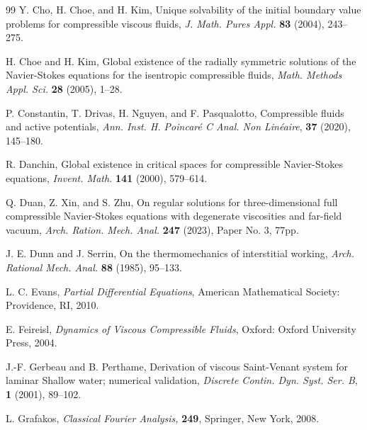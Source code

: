 \documentclass[11pt,reqno]{amsart}
\numberwithin{rk}{section}
\numberwithin{prop}{section}
\numberwithin{mydef}{section}
\numberwithin{lem}{section}
\numberwithin{equation}{section}
\numberwithin{thm}{section}
\begin{document}
\begin{thebibliography}{99}
 Y. Cho, H. Choe, and H. Kim, Unique solvability of the initial boundary value problems for compressible viscous  fluids, \textit{J. Math. Pures Appl.} \textbf{83} (2004), 243--275.


 


 H. Choe and  H. Kim, Global existence of the radially symmetric solutions of the Navier-Stokes equations for the isentropic compressible fluids, \textit{Math. Methods Appl. Sci.} \textbf{28} (2005), 1--28.


 


 P. Constantin, T. Drivas, H. Nguyen, and  F. Pasqualotto, Compressible fluids and active potentials, \textit{Ann. Inst. H. Poincar\'e C  Anal. Non Lin\'eaire}, \textbf{37} (2020), 145--180.


 R. Danchin, Global existence in critical spaces for compressible Navier-Stokes equations, \textit{Invent. Math. } \textbf{141} (2000), 579--614.



 


 Q. Duan, Z. Xin, and S. Zhu, On regular solutions for three-dimensional full compressible Navier-Stokes equations with degenerate viscosities and far-field vacuum, \textit{Arch. Ration. Mech. Anal.} \textbf{247} (2023), Paper No. 3, 77pp.


 J. E. Dunn and  J. Serrin, On the thermomechanics of interstitial working, \textit{Arch. Rational Mech. Anal.} \textbf{88}  (1985), 95--133.

              




 L. C. Evans, {\em Partial Differential Equations}, American Mathematical Society: Providence, RI, 2010.

              


 


 E. Feireisl, \textit{Dynamics of Viscous Compressible Fluids}, Oxford: Oxford University Press, 2004.


 

 J.-F. Gerbeau and B. Perthame, Derivation of viscous Saint-Venant system for laminar Shallow water; numerical validation,  \textit{Discrete Contin. Dyn. Syst. Ser. B}, \textbf{1} (2001), 89--102.




 L. Grafakos, \textit{Classical Fourier Analysis,} \textbf{249}, Springer, New York, 2008.






\end{thebibliography}
\end{document}
